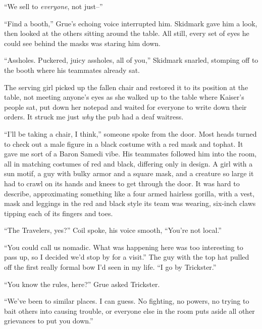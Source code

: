 ``We sell to \emph{everyone}, not just--''



``Find a booth,'' Grue's echoing voice interrupted him.  Skidmark gave him a look, then looked at the others sitting around the table.  All still, every set of eyes he could see behind the masks was staring him down.



``Assholes.  Puckered, juicy assholes, all of you,'' Skidmark snarled, stomping off to the booth where his teammates already sat.



The serving girl picked up the fallen chair and restored it to its position at the table, not meeting anyone's eyes as she walked up to the table where Kaiser's people sat, put down her notepad and waited for everyone to write down their orders.  It struck me just \emph{why} the pub had a deaf waitress.



``I'll be taking a chair, I think,'' someone spoke from the door.  Most heads turned to check out a male figure in a black costume with a red mask and tophat.  It gave me sort of a Baron Samedi vibe.  His teammates followed him into the room, all in matching costumes of red and black, differing only in design.  A girl with a sun motif, a guy with bulky armor and a square mask, and a creature so large it had to crawl on its hands and knees to get through the door.  It was hard to describe, approximating something like a four armed hairless gorilla, with a vest, mask and leggings in the red and black style its team was wearing, six-inch claws tipping each of its fingers and toes.



``The Travelers, yes?'' Coil spoke, his voice smooth, ``You're not local.''



``You could call us nomadic.  What was happening here was too interesting to pass up, so I decided we'd stop by for a visit.'' The guy with the top hat pulled off the first really formal bow I'd seen in my life. ``I go by Trickster.''



``You know the rules, here?'' Grue asked Trickster.



``We've been to similar places.  I can guess.  No fighting, no powers, no trying to bait others into causing trouble, or everyone else in the room puts aside all other grievances to put you down.''



